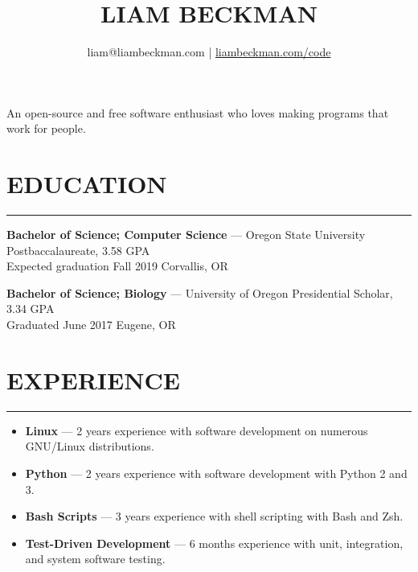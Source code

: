 


\title{\textcolor{my-red}{LIAM BECKMAN}}
\author{liam@liambeckman.com | \href{https://liambeckman.com/code}{liambeckman.com/code}}

\date{\vspace{-5ex}}



\maketitle

\begin{center}
An open-source and free software enthusiast who loves making programs that work for people.
\end{center}

\newcommand{\myTitle}[1] {
    \vspace{-1.5em}
    \section*{\large{#1}}\vspace{-1.7em}
    \textcolor{my-grey}{\rule{\linewidth}{0.5pt}}
    \vspace{-1em}
}

\newcommand{\showoff}[4] {
    \textcolor{my-blue}{\textbf{#1}} --- #2\\
    \textcolor{my-grey}{#3 \hfill #4}
    \medskip
}

\newcommand{\myBreak} {
    \textcolor{my-grey}{\dotfill}
    \smallskip
}

\newcommand{\myItem}[1] {
    \item\textcolor{my-blue}{\textbf{#1}} ---
}

\myTitle{EDUCATION}

\showoff
{Bachelor of Science; Computer Science}
{Oregon State University Postbaccalaureate, 3.58 GPA}
{Expected graduation Fall 2019}
{Corvallis, OR}

\myBreak

\showoff
{Bachelor of Science; Biology}
{University of Oregon Presidential Scholar, 3.34 GPA}
{Graduated June 2017}
{Eugene, OR}

\medbreak

\myTitle{EXPERIENCE}

\vspace{-1em}
\begin{itemize}[label=$\triangleright$]
    \myItem{Linux}2 years experience with software development on numerous GNU/Linux distributions.
    \myItem{Python}2 years experience with software development with Python 2 and 3.
    \myItem{Bash Scripts}3 years experience with shell scripting with Bash and Zsh.
    \myItem{Test-Driven Development}6 months experience with unit, integration, and system software testing.

\end{itemize}

